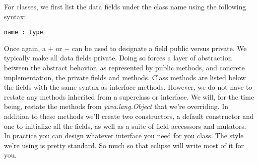 \documentclass[]{tufte-handout}
\begin{document}
For classes, we first list the data fields under the class name using the following syntax:
\begin{verbatim}
name : type
\end{verbatim}
Once again, a $+$ or $-$ can be used to designate a field public versus private. We typically make all data fields private. Doing so forces a layer of abstraction between the abstract behavior, as represented by public methods, and concrete implementation, the private fields and methods. Class methods are listed below the fields with the same syntax as interface methods. However, we do not have to restate any methods inherited from a superclass or interface. We will, for the time being, restate the methods from \textit{java.lang.Object} that we're overriding. In addition to these methods we'll create two constructors, a default constructor and one to initialize all the fields, as well as a suite of field accesssors and mutators. In practice you can design whatever interface you need for you class.  The style we're using is pretty standard. So much so that eclipse will write most of it for you.
\end{document}
